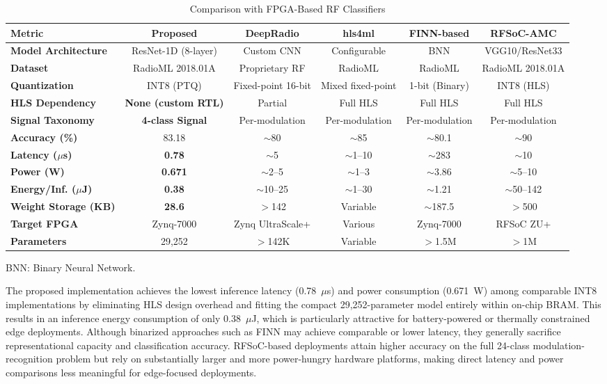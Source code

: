 \documentclass[conference]{IEEEtran}
\begin{document}
\begin{table}[t]
\renewcommand{\arraystretch}{1.3}
\caption{Comparison with FPGA-Based RF Classifiers}
\begin{center}
\begin{tabular}{lccccc}
\toprule
\textbf{Metric} & \textbf{Proposed} & \textbf{DeepRadio \cite{b8}} & \textbf{hls4ml \cite{b12}} & \textbf{FINN-based \cite{b20}} & \textbf{RFSoC-AMC \cite{b9}} \\
\midrule
\textbf{Model Architecture} & ResNet-1D (8-layer) & Custom CNN & Configurable & BNN & VGG10/ResNet33 \\
\textbf{Dataset} & RadioML 2018.01A & Proprietary RF & RadioML & RadioML & RadioML 2018.01A \\
\textbf{Quantization} & INT8 (PTQ) & Fixed-point 16-bit & Mixed fixed-point & 1-bit (Binary) & INT8 (HLS) \\
\textbf{HLS Dependency} & \textbf{None (custom RTL)} & Partial & Full HLS & Full HLS & Full HLS \\
\textbf{Signal Taxonomy} & \textbf{4-class Signal} & Per-modulation & Per-modulation & Per-modulation & Per-modulation \\
\textbf{Accuracy (\%)} & 83.18 & $\sim$80 & $\sim$85 & $\sim$80.1 & $\sim$90 \\
\textbf{Latency ($\mu$s)} & \textbf{0.78} & $\sim$5 & $\sim$1--10 & $\sim$283 & $\sim$10 \\
\textbf{Power (W)} & \textbf{0.671} & $\sim$2--5 & $\sim$1--3 & $\sim$3.86 & $\sim$5--10 \\
\textbf{Energy/Inf. ($\mu$J)} & \textbf{0.38} & $\sim$10--25 & $\sim$1--30 & $\sim$1.21 & $\sim$50--142 \\
\textbf{Weight Storage (KB)} & \textbf{28.6} & $>$142 & Variable & $\sim$187.5 & $>$500 \\
\textbf{Target FPGA} & Zynq-7000 & Zynq UltraScale+ & Various & Zynq-7000 & RFSoC ZU+ \\
\textbf{Parameters} & 29,252 & $>$142K & Variable & $>$1.5M & $>$1M \\
\bottomrule
\end{tabular}
\label{tab:comparison}
\end{center}
\footnotesize{BNN: Binary Neural Network.}
\end{table}
The proposed implementation achieves the lowest inference latency (0.78~$\mu$s) and power consumption (0.671~W) among comparable INT8 implementations by eliminating HLS design overhead and fitting the compact 29,252-parameter model entirely within on-chip BRAM. This results in an inference energy consumption of only 0.38~$\mu$J, which is particularly attractive for battery-powered or thermally constrained edge deployments. Although binarized approaches such as FINN may achieve comparable or lower latency, they generally sacrifice representational capacity and classification accuracy. RFSoC-based deployments attain higher accuracy on the full 24-class modulation-recognition problem but rely on substantially larger and more power-hungry hardware platforms, making direct latency and power comparisons less meaningful for edge-focused deployments.
\end{document}
